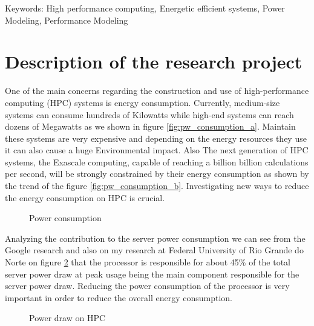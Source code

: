 Keywords: High performance computing, Energetic efficient systems, Power Modeling, Performance Modeling

\section{Description of the research project}

One of the main concerns regarding the construction and use of high-performance computing (HPC) systems is energy consumption. Currently, medium-size systems can consume hundreds of Kilowatts while high-end systems can reach dozens of Megawatts as we shown in figure \ref{fig:pw_consumption_a}. Maintain these systems are very expensive and depending on the energy resources they use it can also cause a huge Environmental impact. Also The next generation of HPC systems, the Exascale computing, capable of reaching a billion billion calculations per second, will be strongly constrained by their energy consumption as shown by the trend of the figure \ref{fig:pw_consumption_b}. Investigating new ways to reduce the energy consumption on HPC is crucial.

\begin{figure}[h]
    \centering
    \qquad
    \caption{Power consumption}%
    \label{fig:pw_consumption}%
\end{figure}

Analyzing the contribution to the server power consumption we can see from the Google research \cite{Fan2007, Barroso2007} and also on my research at Federal University of Rio Grande do Norte on figure \ref{fig:cpu_util} that the processor is responsible for about 45\% of the total server power draw at peak usage being the main component responsible for the server power draw. Reducing the power consumption of the processor is very important in order to reduce the overall energy consumption.

\begin{figure}[h]
    \centering
    \qquad
    \caption{Power draw on HPC}%
    \label{fig:cpu_util}%
\end{figure}

